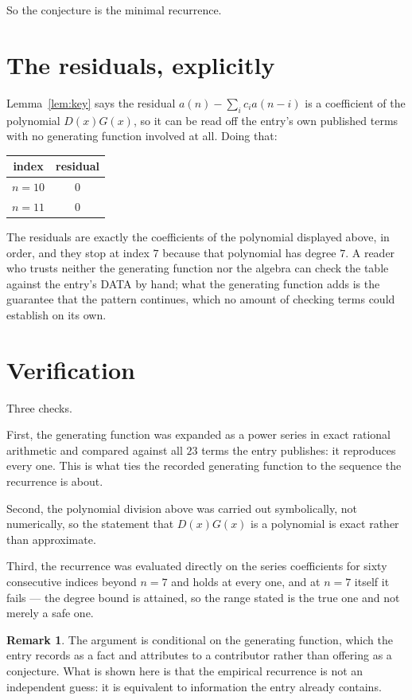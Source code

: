 \documentclass[11pt,a4paper]{article}
\theoremstyle{plain}
\theoremstyle{definition}
\newtheorem{remark}[theorem]{Remark}
\begin{document}
So the conjecture is the minimal recurrence.

\section{The residuals, explicitly}

Lemma~\ref{lem:key} says the residual $a(n)-\sum_ic_ia(n-i)$ is a coefficient of the
polynomial $D(x)G(x)$, so it can be read off the entry's own published terms with no
generating function involved at all. Doing that:
\begin{center}
\begin{tabular}{cc}
index & residual \\ \hline
$n=10$ & $0$ \\
$n=11$ & $0$
\end{tabular}
\end{center}
The residuals are exactly the coefficients of the polynomial displayed above, in order, and
they stop at index $7$ because that polynomial has degree $7$. A reader who trusts
neither the generating function nor the algebra can check the table against the entry's DATA
by hand; what the generating function adds is the guarantee that the pattern continues, which
no amount of checking terms could establish on its own.

\section{Verification}

Three checks.

First, the generating function was expanded as a power series in exact rational arithmetic and
compared against all $23$ terms the entry publishes: it reproduces every one. This is
what ties the recorded generating function to the sequence the recurrence is about.

Second, the polynomial division above was carried out symbolically, not numerically, so the
statement that $D(x)G(x)$ is a polynomial is exact rather than approximate.

Third, the recurrence was evaluated directly on the series coefficients for sixty consecutive
indices beyond $n=7$ and holds at every one, and at $n=7$ itself it fails --- the
degree bound is attained, so the range stated is the true one and not merely a safe one.

\begin{remark}
The argument is conditional on the generating function, which the entry records as a fact and
attributes to a contributor rather than offering as a conjecture. What is shown here is that
the empirical recurrence is not an independent guess: it is equivalent to information the
entry already contains.
\end{remark}
\end{document}

